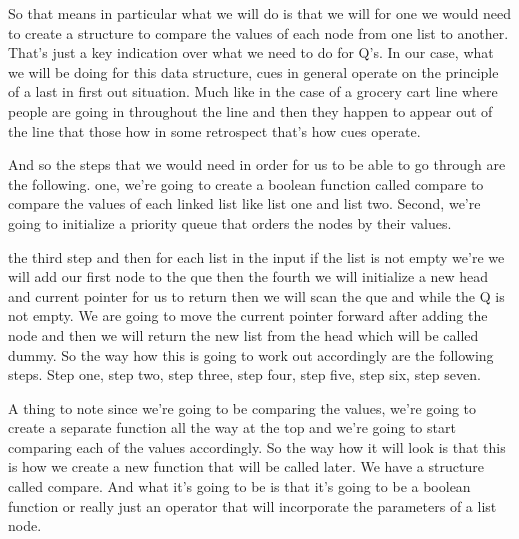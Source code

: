\expandafter\def\csname sourceexcerpt@45\endcsname{%
So that means in particular what we will do is that we will for one we would need to
create a structure to compare the values of each node from one list to another. That's
just a key indication over what we need to do for Q's. In our case, what we will be
doing for this data structure, cues in general operate on the principle of a last in
first out situation. Much like in the case of a grocery cart line where people are
going in throughout the line and then they happen to appear out of the line that those
how in some retrospect that's how cues operate.

And so the steps that we would need in order for us to be able to go through are the
following. one, we're going to create a boolean function called compare to compare the
values of each linked list like list one and list two. Second, we're going to
initialize a priority queue that orders the nodes by their values.

the third step and then for each list in the input if the list is not empty we're we
will add our first node to the que then the fourth we will initialize a new head and
current pointer for us to return then we will scan the que and while the Q is not
empty. We are going to move the current pointer forward after adding the node and then
we will return the new list from the head which will be called dummy. So the way how
this is going to work out accordingly are the following steps. Step one, step two,
step three, step four, step five, step six, step seven.

A thing to note since we're going to be comparing the values, we're going to create a
separate function all the way at the top and we're going to start comparing each of
the values accordingly. So the way how it will look is that this is how we create a
new function that will be called later. We have a structure called compare. And what
it's going to be is that it's going to be a boolean function or really just an
operator that will incorporate the parameters of a list node.
}

